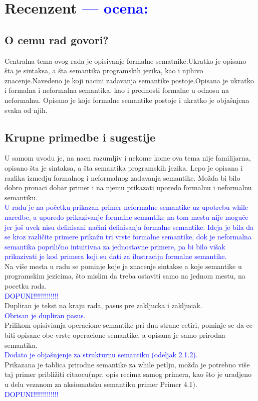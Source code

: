 \documentclass[a4paper]{report}
\newcommand{\odgovor}[1]{\textcolor{blue}{#1}}
\begin{document}
\chapter{Recenzent \odgovor{--- ocena:} }


\section{O cemu rad govori?}

Centralna tema ovog rada je  opisivanje formalne sematnike.Ukratko je opisano šta je sintaksa, a šta semantika programskih jezika, kao i njihivo znacenje.Navedeno je koji nacini zadavanja semantike postoje.Opisana je ukratko i formalna i neformalna semantika, kao i prednosti formalne u odnosu na neformalnu. Opisano je koje formalne semantike postoje i ukratko je objašnjena svaka od njih. 


\section{Krupne primedbe i sugestije}

U samom uvodu je, na nacn razumljiv i nekome kome ova tema nije familijarna, opisano šta je sintaksa, a šta semantika programskih jezika. Lepo je opisana i razlika izmedju formalnog i neformalnog zadavanja semantike. Možda bi bilo dobro pronaci dobar primer i na njemu prikazati uporedo formalnu i neformalnu semantiku.\\
\odgovor{U radu je na početku prikazan primer neformalne semantike uz upotrebu while naredbe, a uporedo prikazivanje formalne semantike na tom mestu nije moguće jer još uvek nisu definisani načini definisanja formalne semantike. Ideja je bila da se kroz različite primere prikažu tri vrste formalne semantike, dok je neformalna semantika poprilično intuitivna za jednostavne primere, pa bi bilo višak prikazivati je kod primera koji su dati za ilustraciju formalne semantike.}\\
 Na više mesta u radu se pominje koje je znacenje sintakse a koje semantike u programskim jezicima, što mislim da treba ostaviti samo na jednom mestu, na pocetku rada. \\
\odgovor{DOPUNI!!!!!!!!!!!!!}\\
Dupliran je tekst na kraju rada, pasus pre zakljucka i zakljucak. \\
\odgovor{Obrisan je dupliran pasus.}\\
Prilikom opisivianja operacione semantike pri dnu strane cetiri, pominje se da ce biti opisane obe vrste operacione semantike, a opisana je samo prirodna  semantika.\\
\odgovor{Dodato je objašnjenje za strukturnu semantiku (odeljak 2.1.2).}\\
 Prikazana je tablica prirodne semantike za while petlju, možda je potrebno više taj primer približiti citaocu(npr. opis recima samog primera, kao što je uradjeno u delu vezanom za aksiomatsku semantiku primer Primer 4.1).    
\\
\odgovor{DOPUNI!!!!!!!!!!!!!}\\
\end{document}
